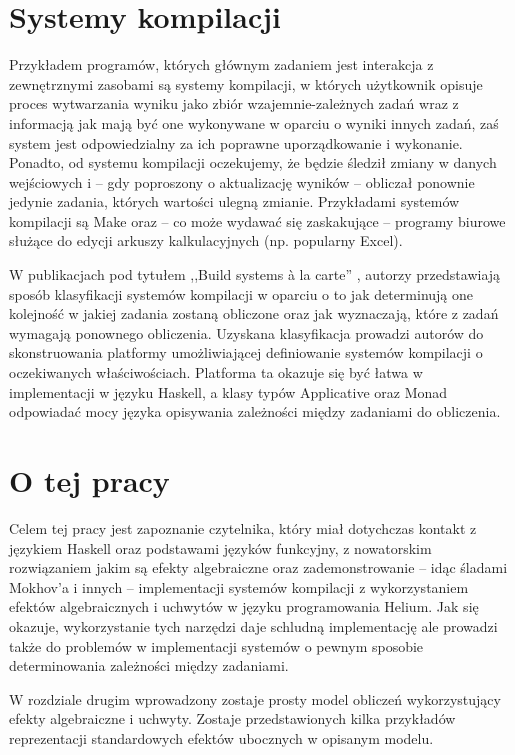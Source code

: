 \section{Systemy kompilacji}

Przykładem programów, których głównym zadaniem jest interakcja z zewnętrznymi zasobami są systemy kompilacji, w których użytkownik opisuje proces wytwarzania wyniku jako zbiór wzajemnie-zależnych zadań wraz z informacją jak mają być one wykonywane w oparciu o wyniki innych zadań, zaś system jest odpowiedzialny za ich poprawne uporządkowanie i wykonanie. Ponadto, od systemu kompilacji oczekujemy, że będzie śledził zmiany w danych wejściowych i -- gdy poproszony o aktualizację wyników -- obliczał ponownie jedynie zadania, których wartości ulegną zmianie. Przykładami systemów kompilacji są Make oraz -- co może wydawać się zaskakujące -- programy biurowe służące do edycji arkuszy kalkulacyjnych (np. popularny Excel).

W publikacjach pod tytułem ,,Build systems {\`a} la carte'' \cite{mokhov2018build, mokhov2020build}, autorzy przedstawiają sposób klasyfikacji systemów kompilacji w oparciu o to jak determinują one kolejność w jakiej zadania zostaną obliczone oraz jak wyznaczają, które z zadań wymagają ponownego obliczenia. Uzyskana klasyfikacja prowadzi autorów do skonstruowania platformy umożliwiającej definiowanie systemów kompilacji o oczekiwanych właściwościach. Platforma ta okazuje się być łatwa w implementacji w języku Haskell, a klasy typów Applicative oraz Monad odpowiadać mocy języka opisywania zależności między zadaniami do obliczenia.

\section{O tej pracy}

Celem tej pracy jest zapoznanie czytelnika, który miał dotychczas kontakt z językiem Haskell oraz podstawami języków funkcyjny, z nowatorskim rozwiązaniem jakim są efekty algebraiczne oraz zademonstrowanie -- idąc śladami Mokhov'a i innych \cite{mokhov2018build, mokhov2020build} -- implementacji systemów kompilacji z wykorzystaniem efektów algebraicznych i uchwytów w języku programowania Helium. Jak się okazuje, wykorzystanie tych narzędzi daje schludną implementację ale prowadzi także do problemów w implementacji systemów o pewnym sposobie determinowania zależności między zadaniami.

W rozdziale drugim wprowadzony zostaje prosty model obliczeń wykorzystujący efekty algebraiczne i uchwyty. Zostaje przedstawionych kilka przykładów reprezentacji standardowych efektów ubocznych w opisanym modelu.

